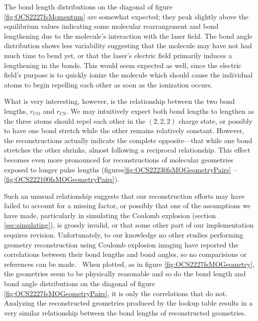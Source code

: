 The bond length distributions on the diagonal of figure \ref{fig:OCS2227fsMomentum} are somewhat expected; they peak slightly above the equilibrium values indicating some molecular rearrangement and bond lengthening due to the molecule's interaction with the laser field. The bond angle distribution shows less variability suggesting that the molecule may have not had much time to bend yet, or that the laser's electric field primarily induces a lengthening in the bonds. This would seem expected as well, since the electric field's purpose is to quickly ionize the molecule which should cause the individual atoms to begin repelling each other as soon as the ionization occurs. %

What is very interesting, however, is the relationship between the two bond lengths, $r_\mathrm{CO}$ and $r_\mathrm{CS}$. We may intuitively expect both bond lengths to lengthen as the three atoms should repel each other in the $(2,2,2)$ charge state, or possibly to have one bond stretch while the other remains relatively constant. However, the reconstructions actually indicate the complete opposite---that while one bond stretches the other shrinks, almost following a reciprocal relationship. This effect becomes even more pronounced for reconstructions of molecular geometries exposed to longer pulse lengths (figures\ref{fig:OCS22230fsMOGeometryPairs} -- \ref{fig:OCS222100fsMOGeometryPairs}).

Such an unusual relationship suggests that our reconstruction efforts may have failed to account for a missing factor, or possibly that one of the assumptions we have made, particularly in simulating the Coulomb explosion (section \ref{sec:simulating}), is grossly invalid, or that some other part of our implementation requires revision. Unfortunately, to our knowledge no other studies performing geometry reconstruction using Coulomb explosion imaging have reported the correlations between their bond lengths and bond angles, so no comparisions or references can be made.\footnotemark~ When plotted, as in figure \ref{fig:OCS2227fsMOGeometry}, the geometries seem to be physically reasonable and so do the bond length and bond angle distributions on the diagonal of figure \ref{fig:OCS2227fsMOGeometryPairs}, it is only the correlations that do not. Analyzing the reconstructed geometries produced by the lookup table results in a very similar relationship between the bond lengths of reconstructed geometries.


